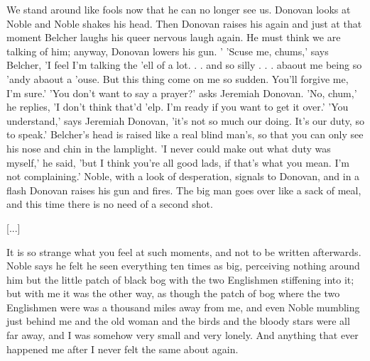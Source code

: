 \documentclass[10pt,a4paper]{article}
\newcommand{\glos}[3]{\dotuline{#1}\marginpar{\scriptsize\textit{#3} #2}}
\begin{document}
We stand around like fools now that he can no longer see us. Donovan looks at Noble and Noble shakes his head. Then Donovan raises his \glos{Webley}{revolver mærke}{propr.} again and just at that moment Belcher laughs his queer nervous laugh again. He must think we are talking of him; anyway, Donovan lowers his gun. ' 'Scuse me, chums,' says Belcher, 'I feel I'm talking the 'ell of a lot. . . and so silly . . . abaout me being so 'andy abaout a 'ouse. But this thing come on me so sudden. You'll forgive me, I'm sure.' 'You don't want to say a prayer?' asks Jeremiah Donovan. 'No, chum,' he replies, 'I don't think that'd 'elp. I'm ready if you want to get it over.' 'You understand,' says Jeremiah Donovan, 'it's not so much our doing. It's our duty, so to speak.' Belcher's head is raised like a real blind man's, so that you can only see his nose and chin in the lamplight. 'I never could make out what duty was myself,' he said, 'but I think you're all good lads, if that's what you mean. I'm not complaining.' Noble, with a look of desperation, signals to Donovan, and in a flash Donovan raises his gun and fires. The big man goes over like a sack of meal, and this time there is no need of a second shot. 

[...]

It is so strange what you feel at such moments, and not to be written afterwards. Noble says he felt he seen everything ten times as big, perceiving nothing around him but the little patch of black bog with the two Englishmen stiffening into it; but with me it was the other way, as though the patch of bog where the two Englishmen were was a thousand miles away from me, and even Noble mumbling just behind me and the old woman and the birds and the bloody stars were all far away, and I was somehow very small and very lonely. And anything that ever happened me after I never felt the same about again. 
\end{document}
